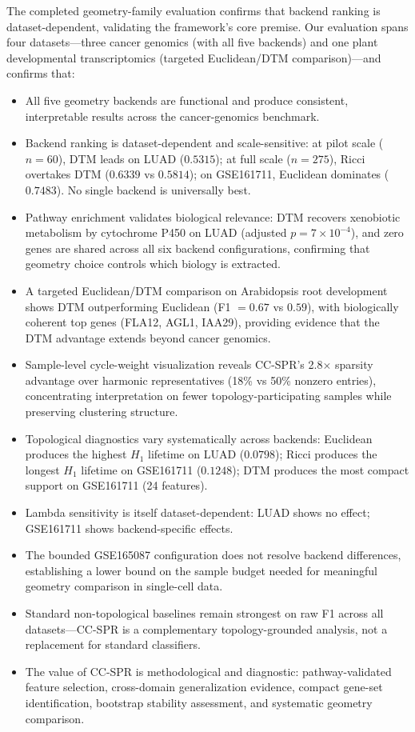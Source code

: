 \documentclass[11pt]{article}
\begin{document}
The completed geometry-family evaluation confirms that backend ranking is dataset-dependent, validating the framework's core premise.
Our evaluation spans four datasets---three cancer genomics (with all five backends) and one plant developmental transcriptomics (targeted Euclidean/DTM comparison)---and confirms that:
\begin{itemize}[leftmargin=1.5em]
\item All five geometry backends are functional and produce consistent, interpretable results across the cancer-genomics benchmark.
\item Backend ranking is dataset-dependent and scale-sensitive: at pilot scale ($n = 60$), DTM leads on LUAD ($0.5315$); at full scale ($n = 275$), Ricci overtakes DTM ($0.6339$ vs $0.5814$); on GSE161711, Euclidean dominates ($0.7483$).
No single backend is universally best.
\item Pathway enrichment validates biological relevance: DTM recovers xenobiotic metabolism by cytochrome P450 on LUAD (adjusted $p = 7 \times 10^{-4}$), and zero genes are shared across all six backend configurations, confirming that geometry choice controls which biology is extracted.
\item A targeted Euclidean/DTM comparison on Arabidopsis root development shows DTM outperforming Euclidean (F1 $= 0.67$ vs $0.59$), with biologically coherent top genes (FLA12, AGL1, IAA29), providing evidence that the DTM advantage extends beyond cancer genomics.
\item Sample-level cycle-weight visualization reveals CC-SPR's 2.8$\times$ sparsity advantage over harmonic representatives (18\% vs 50\% nonzero entries), concentrating interpretation on fewer topology-participating samples while preserving clustering structure.
\item Topological diagnostics vary systematically across backends: Euclidean produces the highest $H_1$ lifetime on LUAD ($0.0798$); Ricci produces the longest $H_1$ lifetime on GSE161711 ($0.1248$); DTM produces the most compact support on GSE161711 (24 features).
\item Lambda sensitivity is itself dataset-dependent: LUAD shows no effect; GSE161711 shows backend-specific effects.
\item The bounded GSE165087 configuration does not resolve backend differences, establishing a lower bound on the sample budget needed for meaningful geometry comparison in single-cell data.
\item Standard non-topological baselines remain strongest on raw F1 across all datasets---CC-SPR is a complementary topology-grounded analysis, not a replacement for standard classifiers.
\item The value of CC-SPR is methodological and diagnostic: pathway-validated feature selection, cross-domain generalization evidence, compact gene-set identification, bootstrap stability assessment, and systematic geometry comparison.
\end{itemize}
\end{document}

